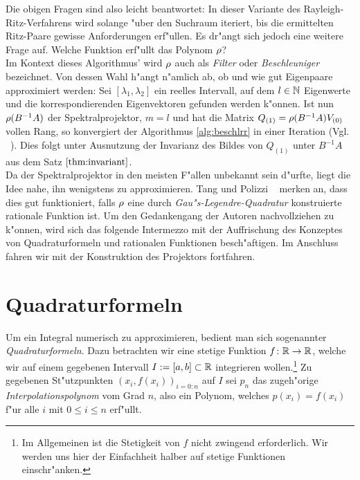 Die obigen Fragen sind also leicht beantwortet: In dieser Variante des Rayleigh-Ritz-Verfahrens wird solange "uber den Suchraum iteriert, bis die ermittelten Ritz-Paare gewisse Anforderungen erf"ullen.
Es dr"angt sich jedoch eine weitere Frage auf. Welche Funktion erf"ullt das Polynom $\rho$?\\

Im Kontext dieses Algorithmus' wird $\rho$ auch als \emph{Filter} oder \emph{Beschleuniger}
bezeichnet. Von dessen Wahl h"angt n"amlich ab, ob und wie gut Eigenpaare approximiert
werden: Sei $[\lambda_1,\lambda_2]$ ein reelles Intervall, auf dem $l\in\mathbb{N}$ Eigenwerte und die korrespondierenden Eigenvektoren gefunden werden k"onnen. Ist nun $\rho(B^{-1}A)$ der Spektralprojektor,
$m=l$ und hat die Matrix $Q_{(1)} = \rho(B^{-1}A) V_{(0)}$ vollen Rang, so konvergiert der Algorithmus \ref{alg:beschlrr} in einer Iteration
(Vgl. ~\cite[356]{ptep}).
Dies folgt unter Ausnutzung der Invarianz des Bildes von $Q_{(1)}$ unter $B^{-1}A$
aus dem Satz $\ref{thm:invariant}$.\\

Da der Spektralprojektor in den meisten F"allen unbekannt sein d"urfte, liegt
die Idee nahe, ihn wenigstens zu approximieren. Tang und Polizzi ~\cite[356]{ptep} merken an, dass dies gut funktioniert, falls $\rho$ eine durch \emph{Gau"s-Legendre-Quadratur} konstruierte rationale Funktion ist.
Um den Gedankengang der Autoren nachvollziehen zu k"onnen, wird sich das folgende Intermezzo mit der Auffrischung des Konzeptes von Quadraturformeln und rationalen Funktionen besch"aftigen. Im Anschluss fahren wir mit der
Konstruktion des Projektors fortfahren.

\section{Quadraturformeln}

Um ein Integral numerisch zu approximieren, bedient man sich sogenannter \emph{Quadraturformeln}. Dazu betrachten wir eine stetige Funktion $f\colon\mathbb{R}\to\mathbb{R}$, welche wir auf einem gegebenen Intervall $I:=[a,b]\subset\mathbb{R}$ integrieren wollen.\footnote{Im Allgemeinen ist die Stetigkeit von $f$ nicht zwingend erforderlich. Wir werden uns hier der Einfachheit halber auf stetige Funktionen einschr"anken.}
Zu gegebenen St"utzpunkten $(x_i, f(x_i))_{i=0:n}$ auf $I$ sei $p_n$ das zugeh"orige \emph{Interpolationspolynom} vom Grad $n$, also ein Polynom, welches $p(x_i) = f(x_i)$ f"ur alle $i$ mit $0\le i\le n$ erf"ullt.\\

